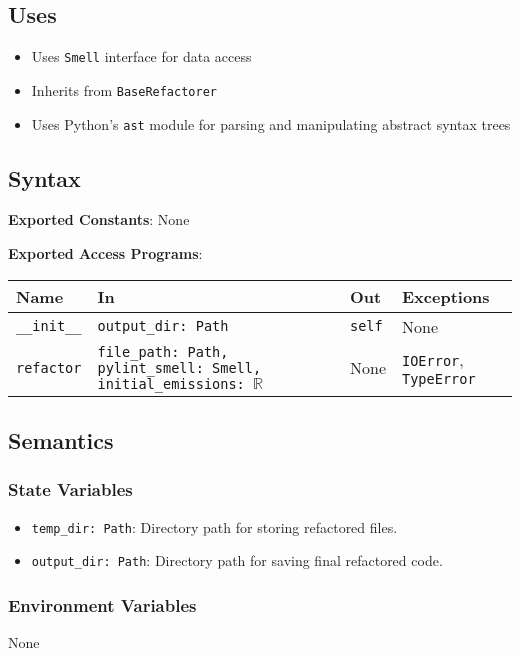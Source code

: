 \documentclass[12pt, titlepage]{article}
\begin{document}
\subsection{Uses}
\begin{itemize}
  \item Uses \texttt{Smell} interface for data access
  \item Inherits from \texttt{BaseRefactorer}
  \item Uses Python's \texttt{ast} module for parsing and manipulating abstract syntax trees
\end{itemize}

\subsection{Syntax}
\noindent
\textbf{Exported Constants}: None

\noindent
\textbf{Exported Access Programs}:\\
\begin{tabularx}{\linewidth}{|
    l|
    >{\raggedright\arraybackslash}X|
    l|
    l|}
  \hline
  \textbf{Name} & \textbf{In} & \textbf{Out} & \textbf{Exceptions} \\\hline
  \texttt{\_\_init\_\_} & \texttt{output\_dir: Path} & \texttt{self} & None \\
  \hline
  \texttt{refactor} & \texttt{file\_path: Path, pylint\_smell: Smell, initial\_emissions: $\mathbb{R}$} & None & \texttt{IOError}, \texttt{TypeError} \\
  \hline
\end{tabularx}

\subsection{Semantics}

\subsubsection{State Variables}
\begin{itemize}
  \item \texttt{temp\_dir: Path}: Directory path for storing refactored files.
  \item \texttt{output\_dir: Path}: Directory path for saving final refactored code.
\end{itemize}

\subsubsection{Environment Variables}
None
\end{document}

